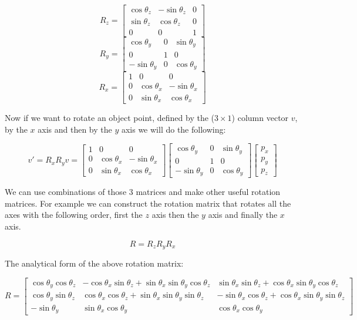 \[
R_z = 
\begin{bmatrix}
\cos\theta_z & -\sin\theta_z & 0 \\
\sin\theta_z & \cos\theta_z & 0 \\
0 & 0 & 1 
\end{bmatrix}
\]
\[
R_y = 
\begin{bmatrix}
\cos\theta_y & 0 & \sin\theta_y \\
0 & 1 & 0\\
-\sin\theta_y & 0 & \cos\theta_y
\end{bmatrix}
\]
\[
R_x = 
\begin{bmatrix}
1 & 0 & 0 \\
0 & \cos\theta_x & -\sin\theta_x \\
0 & \sin\theta_x & \cos\theta_x
\end{bmatrix}
\]

Now if we want to rotate an object point, defined by the (\(3\times1\)) column vector \(v\), by the \(x\) axis and then by the \(y\) axis we will do the following:

\[
v' = R_xR_yv = 
\begin{bmatrix}
1 & 0 & 0 \\
0 & \cos\theta_x & -\sin\theta_x \\
0 & \sin\theta_x & \cos\theta_x
\end{bmatrix}
\begin{bmatrix}
\cos\theta_y & 0 & \sin\theta_y \\
0 & 1 & 0\\
-\sin\theta_y & 0 & \cos\theta_y
\end{bmatrix}
\begin{bmatrix}
p_x\\
p_y\\
p_z
\end{bmatrix}
\]

We can use combinations of those 3 matrices and make other useful rotation matrices. For example we can construct the rotation matrix that rotates all the axes with the following order, first the \(z\) axis then the \(y\) axis and finally the \(x\) axis.

\[
	R = R_zR_yR_x
\]

The analytical form of the above rotation matrix:

\[
R = 
\begin{bmatrix}
\cos\theta_y\cos\theta_z & -\cos\theta_x\sin\theta_z + \sin\theta_x\sin\theta_y\cos\theta_z & \sin\theta_x\sin\theta_z + \cos\theta_x\sin\theta_y\cos\theta_z\\

\cos\theta_y\sin\theta_z & \cos\theta_x\cos\theta_z + \sin\theta_x\sin\theta_y\sin\theta_z & -\sin\theta_x\cos\theta_z + \cos\theta_x\sin\theta_y\sin\theta_z\\

-\sin\theta_y & \sin\theta_x\cos\theta_y & \cos\theta_x\cos\theta_y
\end{bmatrix}
\]

